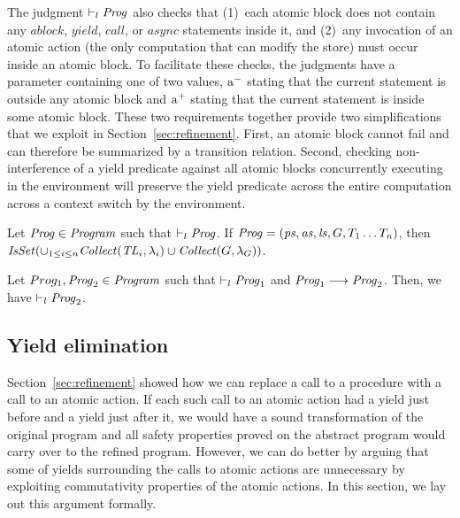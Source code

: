 The judgment $\vdash_l \mathit{Prog}$ also checks that 
(1)~each atomic block does not contain any $\mathit{ablock}$, $\mathit{yield}$, $\mathit{call}$, or $\mathit{async}$ statements inside it, and
(2)~any invocation of an atomic action (the only computation that can modify the store) must occur inside an atomic block.
To facilitate these checks, the judgments have a parameter containing one of two values,
$\mathrm{a^-}$ stating that the current statement is outside any atomic block and
$\mathrm{a^+}$ stating that the current statement is inside some atomic block.
These two requirements together provide two simplifications that we exploit in Section~\ref{sec:refinement}.
First, an atomic block cannot fail and can therefore be summarized by a transition relation.
Second, checking non-interference of a yield predicate against all atomic blocks concurrently executing 
in the environment will preserve the yield predicate across the entire computation across a context switch by the environment.

\begin{lemma}
Let $\mathit{Prog} \in \mathit{Program}$ such that $\vdash_l \mathit{Prog}$.
If $\mathit{Prog} = (\mathit{ps}, \mathit{as}, \mathit{ls}, G, T_1 \ldots T_n)$, 
then $\mathit{IsSet}(\cup_{1 \le i \le n} \mathit{Collect}(\mathit{TL}_i, \lambda_i) \cup \mathit{Collect}(G, \lambda_G))$.
\end{lemma}

\begin{lemma}
Let $Prog_1, \mathit{Prog}_2 \in \mathit{Program}$ such that $\vdash_l \mathit{Prog}_1$ and $\mathit{Prog}_1 \longrightarrow \mathit{Prog}_2$.
Then, we have $\vdash_l \mathit{Prog}_2$.
\end{lemma}

\subsection{Yield elimination}
\label{sec:yield-elimination}

Section~\ref{sec:refinement} showed how we can replace a call to a procedure with 
a call to an atomic action.
If each such call to an atomic action had a yield just before and a yield just after it,
we would have a sound transformation of the original program and all safety properties proved
on the abstract program would carry over to the refined program.
However, we can do better by arguing that some of yields surrounding the calls to atomic actions 
are unnecessary by exploiting commutativity properties of the atomic actions.
In this section, we lay out this argument formally.

